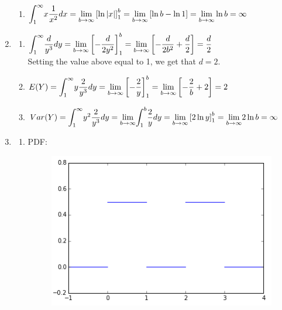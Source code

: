\documentclass{article}
\begin{document}
\begin{enumerate}
\begin{enumerate}
	 \item
	  $\mathlarger{\int}_1^\infty {x \dfrac{1}{x^2} dx}
	    = \mathlarger{\lim}_{b\to\infty}\left[\ln|x|\right]_1^b
	    = \mathlarger{\lim}_{b\to\infty}\left[\ln{b} - \ln{1}\right]
	    = \mathlarger{\lim}_{b\to\infty}\ln{b} = \infty$	  
	\end{enumerate}
      
      \item
	\begin{enumerate}
	 \item
	  $\mathlarger{\int}_1^\infty {\dfrac{d}{y^3}dy}
	    = \mathlarger{\lim}_{b\to\infty}\left[-\dfrac{d}{2y^2}\right]_1^b
	    = \mathlarger{\lim}_{b\to\infty}\left[-\dfrac{d}{2b^2} + \dfrac{d}{2}\right]
	    = \dfrac{d}{2}$ \\
	 
	 Setting the value above equal to 1, we get that $d=2$.
	 
	 \item
	  $E(Y) = \mathlarger{\int}_1^\infty {y \dfrac{2}{y^3} dy} 
	    = \mathlarger{\lim}_{b\to\infty} \left[-\dfrac{2}{y}\right]_1^b
	    = \mathlarger{\lim}_{b\to\infty} \left[-\dfrac{2}{b} + 2\right]
	    = 2$
	    
	 \item
	  $Var(Y) = \mathlarger{\int}_1^\infty {y^2 \dfrac{2}{y^3} dy}
	    = \mathlarger{\lim}_{b\to\infty} \mathlarger{\int}_1^b {\dfrac{2}{y} dy}
	    = \mathlarger{\lim}_{b\to\infty} \left[2\ln{y}\right]_1^b
	    = \mathlarger{\lim}_{b\to\infty} 2\ln{b} = \infty$
	\end{enumerate}
      \addtocounter{enumi}{2}
      
      \newpage
      \item
	\begin{enumerate}
	 \item 
	  PDF:
	  \begin{figure}[h!]
	    \centering
	    \includegraphics[scale=.5,keepaspectratio=true]{./images/pdf_14a.png}
	  \end{figure}
	 

\end{enumerate}
\end{enumerate}
\end{document}
